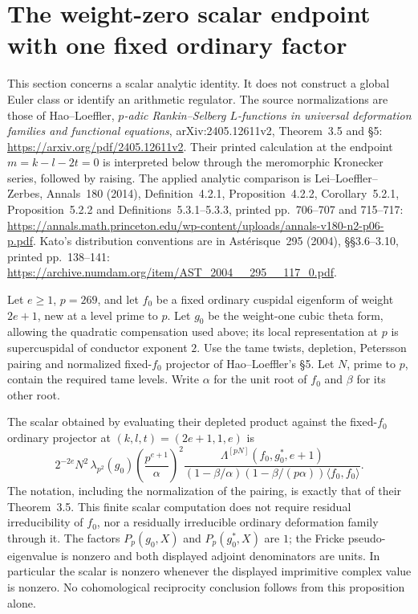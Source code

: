\section{The weight-zero scalar endpoint with one fixed ordinary factor}

This section concerns a scalar analytic identity.  It does not construct
a global Euler class or identify an arithmetic regulator.  The source
normalizations are those of Hao--Loeffler,
\emph{\(p\)-adic Rankin--Selberg \(L\)-functions in universal deformation
families and functional equations}, arXiv:2405.12611v2,
Theorem~3.5 and \S5:
\url{https://arxiv.org/pdf/2405.12611v2}.
Their printed calculation at the endpoint
\(m=k-l-2t=0\) is interpreted below through the meromorphic
Kronecker series, followed by raising.  The applied analytic comparison
is Lei--Loeffler--Zerbes, Annals~180 (2014),
Definition~4.2.1, Proposition~4.2.2, Corollary~5.2.1,
Proposition~5.2.2 and Definitions~5.3.1--5.3.3,
printed pp.~706--707 and 715--717:
\url{https://annals.math.princeton.edu/wp-content/uploads/annals-v180-n2-p06-p.pdf}.
Kato's distribution conventions are in
Ast\'erisque~295 (2004), \S\S3.6--3.10, printed pp.~138--141:
\url{https://archive.numdam.org/item/AST_2004__295__117_0.pdf}.

\begin{proposition}
\label{AC-K32}
Let \(e\geq1\), \(p=269\), and let \(f_0\) be a fixed ordinary
cuspidal eigenform of weight \(2e+1\), new at a level prime to \(p\).
Let \(g_0\) be the weight-one cubic theta form, allowing the quadratic
compensation used above; its local representation at \(p\) is
supercuspidal of conductor exponent \(2\).
Use the tame twists, depletion, Petersson pairing and normalized
fixed-\(f_0\) projector of Hao--Loeffler's \S5.  Let \(N\), prime
to \(p\), contain the required tame levels.  Write \(\alpha\) for
the unit root of \(f_0\) and \(\beta\) for its other root.

The scalar obtained by evaluating their depleted product against
the fixed-\(f_0\) ordinary projector at
\((k,l,t)=(2e+1,1,e)\) is
\[
 2^{-2e}N^2\,\lambda_{p^2}(g_0)
 \left(\frac{p^{e+1}}{\alpha}\right)^2
 \frac{\Lambda^{[pN]}(f_0,g_0^*,e+1)}
 {(1-\beta/\alpha)(1-\beta/(p\alpha))
       \langle f_0,f_0\rangle}.
 \tag{K32.1}
\]
The notation, including the normalization of the pairing, is
exactly that of their Theorem~3.5.  This finite scalar computation
does not require residual irreducibility of \(f_0\), nor a
residually irreducible ordinary deformation family through it.
The factors \(P_p(g_0,X)\) and \(P_p(g_0^*,X)\) are \(1\);
the Fricke pseudo-eigenvalue is nonzero and both displayed
adjoint denominators are units.  In particular the scalar is
nonzero whenever the displayed imprimitive complex value is
nonzero.  No cohomological reciprocity conclusion follows from
this proposition alone.
\end{proposition}

